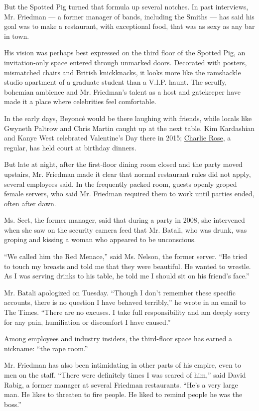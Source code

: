 But the Spotted Pig turned that formula up several notches. In past
interviews, Mr. Friedman --- a former manager of bands, including the
Smiths --- has said his goal was to make a restaurant, with exceptional
food, that was as sexy as any bar in town.

His vision was perhaps best expressed on the third floor of the Spotted
Pig, an invitation-only space entered through unmarked doors. Decorated
with posters, mismatched chairs and British knickknacks, it looks more
like the ramshackle studio apartment of a graduate student than a V.I.P.
haunt. The scruffy, bohemian ambience and Mr. Friedman's talent as a
host and gatekeeper have made it a place where celebrities feel
comfortable.

In the early days, Beyoncé would be there laughing with friends, while
locals like Gwyneth Paltrow and Chris Martin caught up at the next
table. Kim Kardashian and Kanye West celebrated Valentine's Day there in
2015;
\href{https://www.nytimes3xbfgragh.onion/2017/11/20/us/charlie-rose-women.html}{Charlie
Rose}, a regular, has held court at birthday dinners.

But late at night, after the first-floor dining room closed and the
party moved upstairs, Mr. Friedman made it clear that normal restaurant
rules did not apply, several employees said. In the frequently packed
room, guests openly groped female servers, who said Mr. Friedman
required them to work until parties ended, often after dawn.

Ms. Seet, the former manager, said that during a party in 2008, she
intervened when she saw on the security camera feed that Mr. Batali, who
was drunk, was groping and kissing a woman who appeared to be
unconscious.

``We called him the Red Menace,'' said Ms. Nelson, the former server.
``He tried to touch my breasts and told me that they were beautiful. He
wanted to wrestle. As I was serving drinks to his table, he told me I
should sit on his friend's face.''

Mr. Batali apologized on Tuesday. ``Though I don't remember these
specific accounts, there is no question I have behaved terribly,'' he
wrote in an email to The Times. ``There are no excuses. I take full
responsibility and am deeply sorry for any pain, humiliation or
discomfort I have caused.''

Among employees and industry insiders, the third-floor space has earned
a nickname: ``the rape room.''

Mr. Friedman has also been intimidating in other parts of his empire,
even to men on the staff. ``There were definitely times I was scared of
him,'' said David Rabig, a former manager at several Friedman
restaurants. ``He's a very large man. He likes to threaten to fire
people. He liked to remind people he was the boss.''

